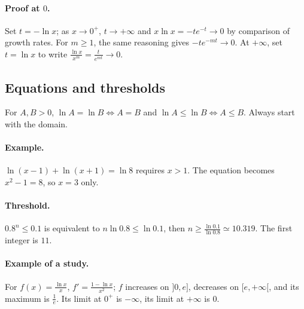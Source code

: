 \paragraph{Proof at $0$.} Set $t=-\ln x$; as $x\to0^+$, $t\to+\infty$ and $x\ln x=-te^{-t}\to0$ by comparison of growth rates. For $m\ge1$, the same reasoning gives $-te^{-mt}\to0$. At $+\infty$, set $t=\ln x$ to write $\frac{\ln x}{x^m}=\frac{t}{e^{mt}}\to0$.
\subsection{Equations and thresholds}
For $A,B>0$, $\ln A=\ln B\Leftrightarrow A=B$ and $\ln A\le\ln B\Leftrightarrow A\le B$. Always start with the domain.
\paragraph{Example.} $\ln(x-1)+\ln(x+1)=\ln8$ requires $x>1$. The equation becomes $x^2-1=8$, so $x=3$ only.
\paragraph{Threshold.} $0.8^n\le0.1$ is equivalent to $n\ln0.8\le\ln0.1$, then $n\ge\frac{\ln 0.1}{\ln 0.8}\simeq10.319$. The first integer is $11$.
\paragraph{Example of a study.} For $f(x)=\frac{\ln x}{x}$, $f'=\frac{1-\ln x}{x^2}$; $f$ increases on $]0,e]$, decreases on $[e,+\infty[$, and its maximum is $\frac{1}{e}$. Its limit at $0^+$ is $-\infty$, its limit at $+\infty$ is $0$.


\begin{center}\end{center}

